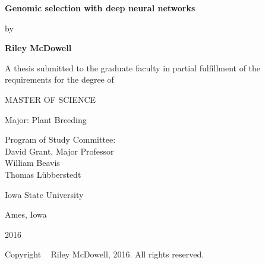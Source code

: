 \begin{titlepage}
\begin{center}

\textbf{Genomic selection with deep neural networks}

\vspace{0.5cm}

by

\vspace{0.5cm}

\textbf{Riley McDowell}

\vspace{2.0cm}

A thesis submitted to the graduate faculty in partial fulfillment of the requirements for the degree of

\vspace{0.5cm}

MASTER OF SCIENCE 

\vspace{2.0cm}

Major: Plant Breeding

\vspace{0.5cm}

Program of Study Committee: \\
David Grant, Major Professor \\
William Beavis \\
Thomas L{\"u}bberstedt \\

\vspace{5.0cm}

Iowa State University

\vspace{0.5cm}

Ames, Iowa

\vspace{0.5cm}

2016

\vspace{1.0cm}

Copyright \textcopyright~ Riley McDowell, 2016. All rights reserved.

\end{center}
\end{titlepage}

